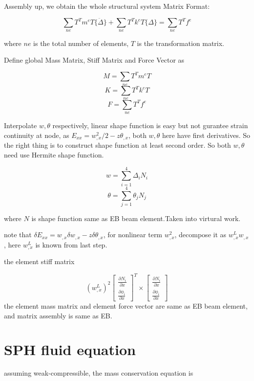 \documentclass[11pt]{article}
\begin{document}
\begin{enumerate}
Assembly up, we obtain the whole structural system Matrix Format:

$$ \sum_{ne} T^T m^e T \{ \ddot{\Delta} \} + \sum_{ne} T^T k^e T \{ \Delta \} = \sum_{ne} T^T f^e $$ 

where $ne$ is the total number of elements, $T$ is the transformation matrix.

Define global Mass Matrix, Stiff Matrix and Force Vector as

$$ M = \sum_{ne} T^T m^e T $$
$$ K = \sum_{ne} T^T k^e T $$
$$ F = \sum_{ne} T^T f^e $$ 



Interpolate $w, \theta$ respectively, linear shape function is easy but not gurantee strain continuity at node, as $E_{xx} = w_{,x}^2/2 - z \theta_{,x} $, both $w, \theta$ here have first derivatives. So the right thing is to construct shape function at least second order. So both $w, \theta$ need use Hermite shape function.
  
$$ w = \sum_{i=1}^4 \Delta_i N_i $$
$$ \theta = \sum_{j=1}^4 \theta_j N_j $$

where $N$ is shape function same as EB beam element.Taken into virtural work.

note that $ \delta E_{xx} = w_{,x} \delta w_{,x} - z \delta \theta_{,x} $, for nonlinear term $ w_{,x}^2$, decompose it as $w_{,x}^L w_{,x}$, here $w_{,x}^L$ is known from last step.

the element stiff matrix  

$$
(w_{,x}^L)^2 \begin{bmatrix} \frac{\partial N_i}{\partial x} \\ \frac{\partial \phi_i}{\partial x} \end{bmatrix} ^T \times \begin{bmatrix} \frac{\partial N_i}{\partial x} \\ \frac{\partial \phi_i}{\partial x} \end{bmatrix}
$$
the element mass matrix and element force vector are same as EB beam element, and matrix assembly is same as EB. 
   
\end{enumerate}

\section{SPH fluid equation}

assuming weak-compressible, the mass conservation equation is
\end{document}
